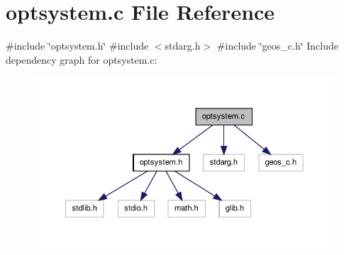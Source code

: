 \hypertarget{a00017}{\section{optsystem.\-c \-File \-Reference}
\label{d4/d51/a00017}
}
{\ttfamily \#include \char`\"{}optsystem.\-h\char`\"{}}\*
{\ttfamily \#include $<$stdarg.\-h$>$}\*
{\ttfamily \#include \char`\"{}geos\-\_\-c.\-h\char`\"{}}\*
\-Include dependency graph for optsystem.\-c\-:\nopagebreak
\begin{figure}[H]
\begin{center}
\leavevmode
\includegraphics[width=350pt]{dc/d3c/a00028}
\end{center}
\end{figure}
